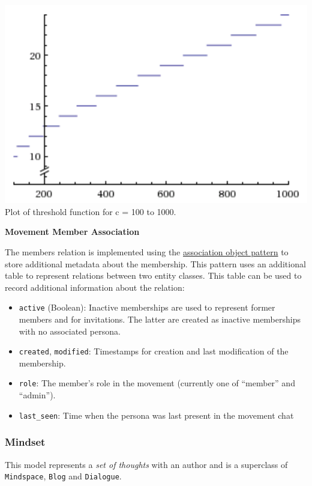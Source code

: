 \includegraphics{img/threshold_2.png}\\
 Plot of threshold function for c = 100 to 1000.

\textbf{Movement Member Association}

The members relation is implemented using the
\href{http://docs.sqlalchemy.org/en/rel_1_0/orm/basic_relationships.html\#association-object}{association
object pattern} to store additional metadata about the membership. This
pattern uses an additional table to represent relations between two
entity classes. This table can be used to record additional information
about the relation:

\begin{itemize}
\tightlist
\item
  \texttt{active} (Boolean): Inactive memberships are used to represent
  former members and for invitations. The latter are created as inactive
  memberships with no associated persona.
\item
  \texttt{created}, \texttt{modified}: Timestamps for creation and last
  modification of the membership.
\item
  \texttt{role}: The member's role in the movement (currently one of
  ``member'' and ``admin'').
\item
  \texttt{last\_seen}: Time when the persona was last present in the
  movement chat
\end{itemize}

\subsubsection{Mindset}\label{mindset}

This model represents a \emph{set of thoughts} with an author and is a
superclass of \texttt{Mindspace}, \texttt{Blog} and \texttt{Dialogue}.

